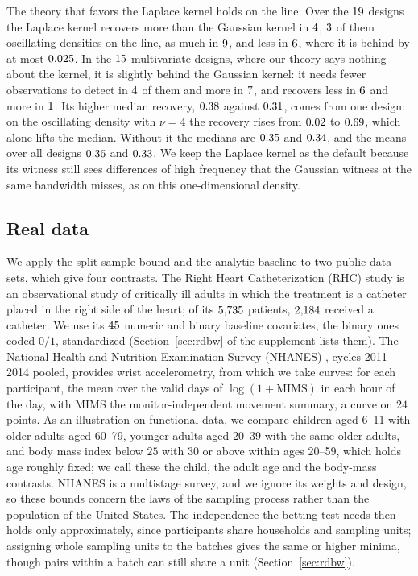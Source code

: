 The theory that favors the Laplace kernel holds on the line. Over the $19$ designs the Laplace kernel
recovers more than the Gaussian kernel in $4$, $3$ of them oscillating densities on the
line, as much in $9$, and less in $6$, where it is behind by at most
$0.025$. In the $15$ multivariate designs, where our theory says nothing about the kernel, it is
slightly behind the Gaussian kernel: it needs fewer observations to detect in $4$ of them and
more in $7$, and recovers less in $6$ and more in $1$. Its
higher median recovery, $0.38$ against $0.31$, comes from one design: on the oscillating
density with $\nu=4$ the recovery rises from $0.02$ to $0.69$, which alone lifts the median.
Without it the medians are $0.35$ and $0.34$, and the means over all designs
$0.36$ and $0.33$. We keep the Laplace kernel as the default because its witness still sees
differences of high frequency that the Gaussian witness at the same bandwidth misses, as on this one-dimensional
density.

\subsection{Real data}
\label{sec:data}

We apply the split-sample bound and the analytic baseline to two public data sets, which give four contrasts. The
Right Heart Catheterization (RHC) study \citep{connors1996rhc} is an observational study of critically ill adults in
which the treatment is a catheter placed in the right side of the heart; of its $5{,}735$ patients, $2{,}184$
received a catheter. We use its $45$ numeric and binary baseline covariates, the binary ones coded $0/1$,
standardized (Section~\ref{sec:rdbw} of the supplement lists them). The National Health and Nutrition Examination
Survey (NHANES) \citep{nhanes2012,john2019mims}, cycles 2011--2014 pooled, provides wrist accelerometry, from which we
take curves: for each participant, the mean over the valid days of $\log(1+\mathrm{MIMS})$ in each hour of the day,
with MIMS the monitor-independent movement summary, a curve on $24$ points. As an illustration on functional data, we
compare children aged 6--11 with older adults aged 60--79, younger adults aged 20--39 with the same older adults, and
body mass index below $25$ with $30$ or above within ages 20--59, which holds age roughly fixed; we call these the
child, the adult age and the body-mass contrasts. NHANES is a multistage survey, and we ignore its weights and design,
so these bounds concern the laws of the sampling process rather than the population of the United States. The
independence the betting test needs then holds only approximately, since participants share households and sampling
units; assigning whole sampling units to the batches gives the same or higher minima, though pairs within a batch can
still share a unit (Section~\ref{sec:rdbw}).

